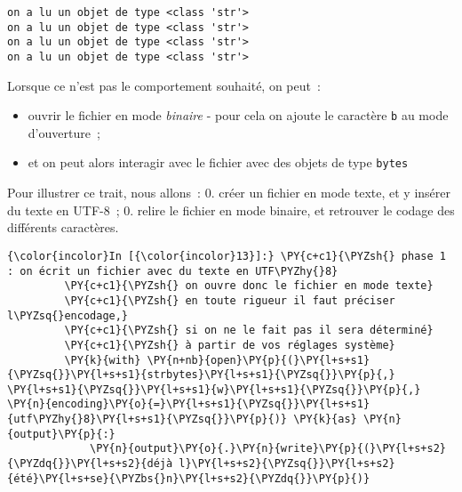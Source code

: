     \begin{Verbatim}[commandchars=\\\{\},frame=single,framerule=0.3mm,rulecolor=\color{cellframecolor}]
on a lu un objet de type <class 'str'>
on a lu un objet de type <class 'str'>
on a lu un objet de type <class 'str'>
on a lu un objet de type <class 'str'>
\end{Verbatim}

    Lorsque ce n'est pas le comportement souhaité, on peut~:

\begin{itemize}
\tightlist
\item
  ouvrir le fichier en mode \emph{binaire} - pour cela on ajoute le
  caractère \texttt{b} au mode d'ouverture~;
\item
  et on peut alors interagir avec le fichier avec des objets de type
  \texttt{bytes}
\end{itemize}

    Pour illustrer ce trait, nous allons~: 0. créer un fichier en mode
texte, et y insérer du texte en UTF-8~; 0. relire le fichier en mode
binaire, et retrouver le codage des différents caractères.

    \begin{Verbatim}[commandchars=\\\{\},frame=single,framerule=0.3mm,rulecolor=\color{cellframecolor}]
{\color{incolor}In [{\color{incolor}13}]:} \PY{c+c1}{\PYZsh{} phase 1 : on écrit un fichier avec du texte en UTF\PYZhy{}8}
         \PY{c+c1}{\PYZsh{} on ouvre donc le fichier en mode texte}
         \PY{c+c1}{\PYZsh{} en toute rigueur il faut préciser l\PYZsq{}encodage,}
         \PY{c+c1}{\PYZsh{} si on ne le fait pas il sera déterminé}
         \PY{c+c1}{\PYZsh{} à partir de vos réglages système}
         \PY{k}{with} \PY{n+nb}{open}\PY{p}{(}\PY{l+s+s1}{\PYZsq{}}\PY{l+s+s1}{strbytes}\PY{l+s+s1}{\PYZsq{}}\PY{p}{,} \PY{l+s+s1}{\PYZsq{}}\PY{l+s+s1}{w}\PY{l+s+s1}{\PYZsq{}}\PY{p}{,} \PY{n}{encoding}\PY{o}{=}\PY{l+s+s1}{\PYZsq{}}\PY{l+s+s1}{utf\PYZhy{}8}\PY{l+s+s1}{\PYZsq{}}\PY{p}{)} \PY{k}{as} \PY{n}{output}\PY{p}{:}
             \PY{n}{output}\PY{o}{.}\PY{n}{write}\PY{p}{(}\PY{l+s+s2}{\PYZdq{}}\PY{l+s+s2}{déjà l}\PY{l+s+s2}{\PYZsq{}}\PY{l+s+s2}{été}\PY{l+s+se}{\PYZbs{}n}\PY{l+s+s2}{\PYZdq{}}\PY{p}{)}
\end{Verbatim}


